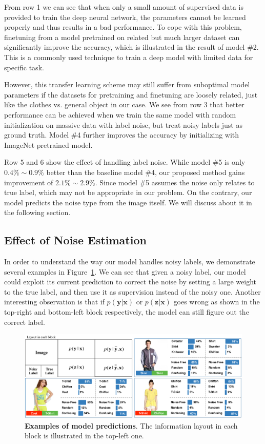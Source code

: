 \documentclass[10pt,twocolumn,letterpaper]{article}
\def\vec{\mathbf}
\begin{document}
From row 1 we can see that when only a small amount of supervised data is provided to train the deep neural network, the parameters cannot be learned properly and thus results in a bad performance. To cope with this problem, finetuning from a model pretrained on related but much larger dataset can significantly improve the accuracy, which is illustrated in the result of model \#2. This is a commonly used technique to train a deep model with limited data for specific task.

However, this transfer learning scheme may still suffer from suboptimal model parameters if the datasets for pretraining and finetuning are loosely related, just like the clothes vs. general object in our case. We see from row 3 that better performance can be achieved when we train the same model with random initialization on massive data with label noise, but treat noisy labels just as ground truth. Model \#4 further improves the accuracy by initializing with ImageNet pretrained model.

Row 5 and 6 show the effect of handling label noise. While model \#5 is only $0.4\% \sim 0.9\%$ better than the baseline model \#4, our proposed method gains improvement of $2.1\% \sim 2.9\%$. Since model \#5 assumes the noise only relates to true label, which may not be appropriate in our problem. On the contrary, our model predicts the noise type from the image itself. We will discuss about it in the following section.

\subsection{Effect of Noise Estimation} %
\label{sub:effect_of_noise_estimation}
In order to understand the way our model handles noisy labels, we demonstrate several examples in Figure~\ref{fig:model_output}. We can see that given a noisy label, our model could exploit its current prediction to correct the noise by setting a large weight to the true label, and then use it as supervision instead of the noisy one. Another interesting observation is that if $p(\vec{y}|\vec{x})$ or $p(\vec{z}|\vec{x})$ goes wrong as shown in the top-right and bottom-left block respectively, the model can still figure out the correct label.

\begin{figure}
\begin{center}
\end{center}
\includegraphics[width=1.0\linewidth]{figure/model_output.pdf}
\caption{\textbf{Examples of model predictions}. The information layout in each block is illustrated in the top-left one.}
\label{fig:model_output}
\end{figure}
\end{document}
